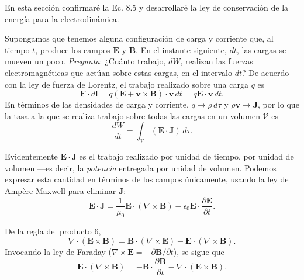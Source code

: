 \documentclass[12pt,a4paper]{report}
\newcommand{\esp}{\vspace{0.5cm}}
\begin{document}
	En esta sección confirmaré la Ec. 8.5 y desarrollaré la ley de conservación de la energía para la electrodinámica.
	
	Supongamos que tenemos alguna configuración de carga y corriente que, al tiempo $t$, produce los campos $\mathbf{E}$ y $\mathbf{B}$. En el instante siguiente, $dt$, las cargas se mueven un poco. \textit{Pregunta}: ¿Cuánto trabajo, $dW$, realizan las fuerzas electromagnéticas que actúan sobre estas cargas, en el intervalo $dt$? De acuerdo con la ley de fuerza de Lorentz, el trabajo realizado sobre una carga $q$ es
	\begin{equation*}
		\mathbf{F} \cdot d\mathbf{l} = q(\mathbf{E} + \mathbf{v} \times \mathbf{B}) \cdot \mathbf{v} \, dt = q\mathbf{E} \cdot \mathbf{v} \, dt.
	\end{equation*}
	En términos de las densidades de carga y corriente, $q \rightarrow \rho \, d\tau$ y $\rho\mathbf{v} \rightarrow \mathbf{J}$, por lo que la tasa a la que se realiza trabajo sobre todas las cargas en un volumen $\mathcal{V}$ es
	\begin{equation}
		\frac{dW}{dt} = \int_{\mathcal{V}} (\mathbf{E} \cdot \mathbf{J}) \, d\tau. \tag{8.6}
	\end{equation}
	
	\esp
	
	Evidentemente $\mathbf{E} \cdot \mathbf{J}$ es el trabajo realizado por unidad de tiempo, por unidad de volumen ---es decir, la \textit{potencia} entregada por unidad de volumen. Podemos expresar esta cantidad en términos de los campos únicamente, usando la ley de Ampère-Maxwell para eliminar $\mathbf{J}$:
	\begin{equation*}
		\mathbf{E} \cdot \mathbf{J} = \frac{1}{\mu_0} \mathbf{E} \cdot (\nabla \times \mathbf{B}) - \epsilon_0 \mathbf{E} \cdot \frac{\partial \mathbf{E}}{\partial t}.
	\end{equation*}
	
	De la regla del producto 6,
	\begin{equation*}
		\nabla \cdot (\mathbf{E} \times \mathbf{B}) = \mathbf{B} \cdot (\nabla \times \mathbf{E}) - \mathbf{E} \cdot (\nabla \times \mathbf{B}).
	\end{equation*}
	Invocando la ley de Faraday ($\nabla \times \mathbf{E} = -\partial \mathbf{B}/\partial t$), se sigue que
	\begin{equation*}
		\mathbf{E} \cdot (\nabla \times \mathbf{B}) = -\mathbf{B} \cdot \frac{\partial \mathbf{B}}{\partial t} - \nabla \cdot (\mathbf{E} \times \mathbf{B}).
	\end{equation*}
	
\end{document}
